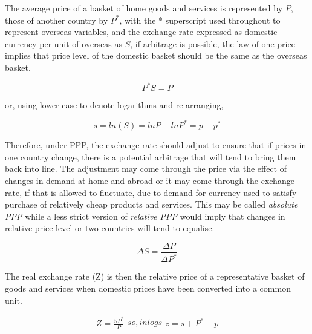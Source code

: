 \documentclass[12pt, a4paper, oneside]{article}\usepackage[]{graphicx}\usepackage[]{color}
\begin{document}
The average price of a basket of home goods and services is represented by $P$, those of another country by $P^*$, with the * superscript used throughout to represent overseas variables, and the exchange rate expressed as domestic currency per unit of overseas as $S$, if arbitrage is possible, the law of one price implies that price level of the domestic basket should be the same as the overseas basket. 

\begin{equation}
 P^*S=P
\end{equation}

or, using lower case to denote logarithms and re-arranging,

\begin{equation}
\label{eqref:ppp}
s = ln(S) = lnP - lnP^* = p-p^*
\end{equation}

Therefore, under PPP, the exchange rate should adjust to ensure that if prices in one country change, there is a potential arbitrage that will tend to bring them back into line.  The adjustment may come through the price via the effect of changes in demand at home and abroad or it may come through the exchange rate, if that is allowed to fluctuate, due to demand for currency used to satisfy purchase of relatively cheap products and services.   This may be called \emph{absolute PPP} while a less strict version of \emph{relative PPP} would imply that changes in relative price level or two countries will tend to equalise.

\begin{equation}\label{relPPP}
\Delta S=\frac{\Delta P}{\Delta P^*}
\end{equation}

The real exchange rate (Z)  is then the relative price of a representative basket of goods and services when domestic prices have been converted into a common unit.   

\begin{subequations}
\begin{align}
Z=\frac{SP^*}{P}
\end{align}
so, in logs
\begin{align}
z = s + P^* - p
\end{align}
\end{subequations}
\end{document}
